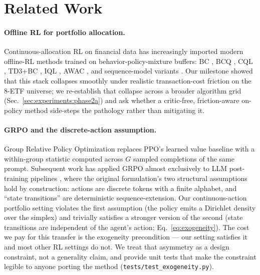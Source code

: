 
\section{Related Work}
\label{sec:related}

\paragraph{Offline RL for portfolio allocation.} Continuous-allocation
RL on financial data \citep{jiang2017deep,liu2020finrl,moody2001learning,
deng2017deep} has increasingly imported modern offline-RL methods
trained on behavior-policy-mixture buffers: BC \citep{pomerleau1991efficient},
BCQ \citep{fujimoto2019off}, CQL \citep{kumar2020conservative},
TD3+BC \citep{fujimoto2021minimalist}, IQL \citep{kostrikov2022offline},
AWAC \citep{nair2020awac}, and sequence-model variants
\citep{chen2021decision,an2021uncertainty}. Our milestone showed that
this stack collapses smoothly under realistic transaction-cost friction
on the 8-ETF universe; we re-establish that collapse across a broader
algorithm grid (Sec.~\ref{sec:experiments:phase2a}) and ask whether a
critic-free, friction-aware on-policy method side-steps the pathology
rather than mitigating it.

\paragraph{GRPO and the discrete-action assumption.} Group Relative
Policy Optimization \citep{shao2024deepseekmath} replaces PPO's learned
value baseline with a within-group statistic computed across $G$
sampled completions of the same prompt. Subsequent work has applied
GRPO almost exclusively to LLM post-training pipelines
\citep{dong2024rlhf}, where the original formulation's two structural
assumptions hold by construction: actions are discrete
tokens with a finite alphabet, and ``state transitions'' are
deterministic sequence-extension. Our continuous-action portfolio
setting violates the first assumption (the policy emits a Dirichlet
density over the simplex) and trivially satisfies a stronger version
of the second (state transitions are independent of the agent's
action; Eq.~\ref{eq:exogeneity}). The cost we pay for this transfer is
the exogeneity precondition --- our setting satisfies it and most
other RL settings do not. We treat that asymmetry as a design
constraint, not a generality claim, and provide unit tests that make
the constraint legible to anyone porting the method
(\texttt{tests/test\_exogeneity.py}).

